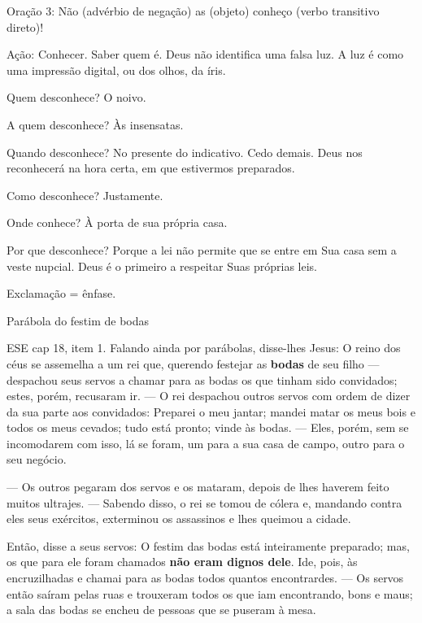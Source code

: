 \documentclass{rbfin}
\begin{document}
\begin{multicols}{2}
\dotfill

\newpage

Oração 3: Não (advérbio de negação) as (objeto) conheço (verbo transitivo direto)!

Ação: Conhecer. Saber quem é. Deus não identifica uma falsa luz. A luz é como uma impressão digital, ou dos olhos, da íris.

Quem desconhece? O noivo.

A quem desconhece? Às insensatas.

Quando desconhece? No presente do indicativo. Cedo demais. Deus nos reconhecerá na hora certa, em que estivermos preparados.

Como desconhece? Justamente.

Onde conhece? À porta de sua própria casa.

Por que desconhece? Porque a lei não permite que se entre em Sua casa sem a veste nupcial. Deus é o primeiro a respeitar Suas próprias leis.

Exclamação = ênfase.

\dotfill

\newpage

Parábola do festim de bodas

ESE cap 18, item 1. Falando ainda por parábolas, disse-lhes Jesus: O reino dos céus se assemelha a um rei que, querendo festejar as \textbf{bodas} de seu filho — despachou seus servos a chamar para as bodas os que tinham sido convidados; estes, porém, recusaram ir. — O rei despachou outros servos com ordem de dizer da sua parte aos convidados: Preparei o meu jantar; mandei matar os meus bois e todos os meus cevados; tudo está pronto; vinde às bodas. — Eles, porém, sem se incomodarem com isso, lá se foram, um para a sua casa de campo, outro para o seu negócio.

— Os outros pegaram dos servos e os mataram, depois de lhes haverem feito muitos ultrajes. — Sabendo disso, o rei se tomou de cólera e, mandando contra eles seus exércitos, exterminou os assassinos e lhes queimou a cidade.

Então, disse a seus servos: O festim das bodas está inteiramente preparado; mas, os que para ele foram chamados \textbf{não eram dignos dele}. Ide, pois, às encruzilhadas e chamai para as bodas todos quantos encontrardes. — Os servos então saíram pelas ruas e trouxeram todos os que iam encontrando, bons e maus; a sala das bodas se encheu de pessoas que se puseram à mesa.

\newpage


\end{multicols}
\end{document}
